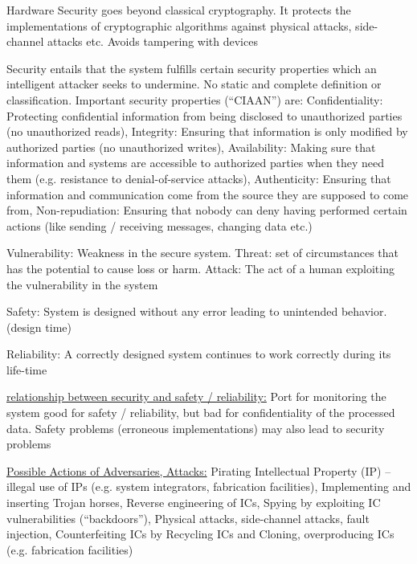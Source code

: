 \documentclass[landscape, a4paper]{article}
\begin{document}
\fontsize{3pt}{3pt}\selectfont

\begin{minipage}[t]{0.2\linewidth}
	\begin{betterlist}
		\item \alert{Hardware Security} goes beyond classical cryptography. It protects the implementations of cryptographic algorithms against physical attacks, side-channel attacks etc. Avoids tampering with devices
		\item \alert{Security} entails that the system fulfills certain security properties which an intelligent attacker seeks to undermine. No static and complete definition or classification. \alert{Important security properties (\enquote{CIAAN}) are:} \alert{Confidentiality:} Protecting confidential information from being disclosed to unauthorized parties (no unauthorized reads), \alert{Integrity:} Ensuring that information is only modified by authorized parties (no unauthorized writes), \alert{Availability:} Making sure that information and systems are accessible to authorized parties when they need them (e.g. resistance to denial-of-service attacks), \alert{Authenticity:} Ensuring that information and communication come from the source they are supposed to come from, \alert{Non-repudiation:} Ensuring that nobody can deny having performed certain actions (like sending / receiving messages, changing data etc.)
		\item \alert{Vulnerability:} Weakness in the secure system. \alert{Threat:} set of circumstances that has the potential to cause loss or harm. \alert{Attack:} The act of a human exploiting the vulnerability in the system
		\item \alert{Safety:} System is designed without any error leading to unintended behavior. (\alert{design time})
		\item \alert{Reliability:} A correctly designed system continues to work correctly during its \alert{life-time}
		\begin{betterlist}
			\item \underline{relationship between security and safety / reliability:} Port for monitoring the system good for safety / reliability, but bad for confidentiality of the processed data. Safety problems (erroneous implementations) may also lead to security problems
		\end{betterlist}
		\item \underline{Possible Actions of Adversaries, Attacks:} Pirating Intellectual Property (IP) – illegal use of IPs (e.g. system integrators, fabrication facilities), Implementing and inserting Trojan horses, Reverse engineering of ICs, Spying by exploiting IC vulnerabilities (\enquote{backdoors}), Physical attacks, side-channel attacks, fault injection, Counterfeiting ICs by Recycling ICs and Cloning, overproducing ICs (e.g. fabrication facilities)

\end{betterlist}
\end{minipage}
\end{document}
